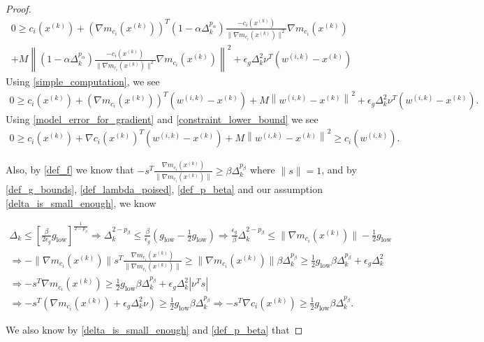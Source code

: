 \documentclass{article}
\theoremstyle{case}
\newcommand{\xk}{{x^{(k)}}}
\newcommand{\dk}{\Delta_k}
\newcommand{\wik}{{w^{(i, k)}}}
\newcommand{\gmcik}{{\nabla m_{c_i}(\xk)}}
\newcommand{\hgik}{{\frac{\nabla m_{c_i}(\xk)}{\|\nabla m_{c_i}(\xk)\|}}}
\newcommand{\mingrad}{{ g_{\text{low}} }}
\begin{document}
\begin{proof}
\begin{align*}
0 \ge c_i(\xk) + \left(\gmcik\right)^T\left(1 - \alpha \dk^{p_{\alpha}}\right)\frac{-c_i(\xk)}{\|\gmcik\|^2}\gmcik  \\
+ M \left\|\left(1 - \alpha \dk^{p_{\alpha}}\right)\frac{-c_i(\xk)}{\|\gmcik\|^2}\gmcik\right\|^2
+ \epsilon_g \dk^2\nu^T \left(\wik - \xk\right)
\end{align*}
Using \cref{simple_computation}, we see
\begin{align*}
0 \ge c_i(\xk) + \left(\gmcik\right)^T\left(\wik - \xk\right)+ M \left\|\wik - \xk\right\|^2  + \epsilon_g \dk^2\nu^T \left(\wik - \xk\right).
\end{align*}
Using \cref{model_error_for_gradient} and \cref{constraint_lower_bound} we see
\begin{align}
0 \ge c_i(\xk) + \nabla c_i(\xk)^T\left(\wik - \xk \right) + M \left\|\wik - \xk\right\|^2 \ge c_i(\wik). \label{c_is_negative}
\end{align}


Also, by \cref{def_f} we know that $-s^T \hgik \ge \beta \dk^{p_{\beta}}$ where $\|s\| = 1$, and by \cref{def_g_bounds}, \cref{def_lambda_poised}, \cref{def_p_beta} and our assumption \cref{delta_is_small_enough}, we know

\begin{align}
\dk \le \left[\frac{\beta}{2\epsilon_{g}}\mingrad \right]^{\frac 1 {2 - p_{\beta}}}
\Longrightarrow \dk^{2 - p_{\beta}} \le \frac{\beta}{\epsilon_{g}}\left(\mingrad  - \frac 1 2 \mingrad \right)
\Longrightarrow \frac{\epsilon_{g}}{\beta} \dk^{2 - p_{\beta}} \le \|\gmcik\| - \frac 1 2 \mingrad  \nonumber \\
\Longrightarrow -\|\gmcik\|s^T\hgik \ge \|\gmcik\|\beta\dk^{p_{\beta}} \ge \frac 1 2 \mingrad  \beta \dk^{p_{\beta}} + \epsilon_{g}\dk^2  \nonumber \\
\Longrightarrow -s^T\gmcik \ge \frac 1 2 \mingrad  \beta \dk^{p_{\beta}} + \epsilon_{g}\dk^2|\nu^T s| \nonumber \\ 
\Longrightarrow -s^T\left(\gmcik + \epsilon_{g}\dk^2\nu\right) \ge \frac 1 2 \mingrad  \beta \dk ^{p_{\beta}}
\Longrightarrow -s^T\nabla c_i(\xk) \ge \frac 1 2 \mingrad  \beta \dk^{p_{\beta}}. \label{nsc_pos}
\end{align}


We also know by \cref{delta_is_small_enough} and \cref{def_p_beta} that



\end{proof}
\end{document}
